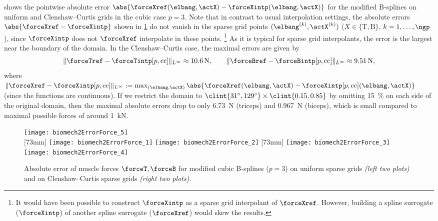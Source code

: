  shows the pointwise absolute error
$\abs{\forceXref(\elbang, \actX) - \forceXintp(\elbang, \actX)}$
for the modified B-splines on uniform and Clenshaw--Curtis grids
in the cubic case $p = 3$.
Note that in contrast to usual interpolation settings,
the absolute errors $\abs{\forceXref - \forceXintp}$
shown in \cref{fig:biomech2ErrorForce} do not vanish in the
sparse grid points $(\elbang^{(k)}, \actX^{(k)})$
($X \in \{\mathrm{T}, \mathrm{B}\}$, $k = 1, \dotsc, \ngp$),
since $\forceXintp$ does not $\forceXref$ interpolate
in these points.%
\footnote{%
  It would have been possible to construct $\forceXintp$
  as a sparse grid interpolant of $\forceXref$.
  However, building a spline surrogate ($\forceXintp$)
  of another spline surrogate ($\forceXref$) would skew the results.%
}
As it is typical for sparse grid interpolants,
the error is the largest near the boundary of the domain.
In the Clenshaw--Curtis case, the maximal errors are given by
\begin{equation}
  \norm[L^\infty]{\forceTref - \forceTintp[p,\cc]}
  \approx \SI{10.6}{\newton},\qquad
  \norm[L^\infty]{\forceBref - \forceBintp[p,\cc]}
  \approx \SI{9.51}{\newton},
\end{equation}
where $\norm[L^\infty]{\forceXref - \forceXintp[p,\cc]}
:= \max_{(\elbang, \actX)}
\abs{\forceXref(\elbang, \actX) - \forceXintp[p,\cc](\elbang, \actX)}$
(since the functions are continuous).
If we restrict the domain to
$\clint{\ang{31}, \ang{129}} \times \clint{0.15, 0.85}$
by omitting \SI{15}{\percent} on each side of the original domain,
then the maximal absolute errors drop to only
\SI{6.73}{\newton} (triceps) and \SI{0.967}{\newton} (biceps),
which is small compared to maximal possible forces of
around \SI{1}{\kilo\newton}.

\begin{figure}
  \texttt{[image: biomech2ErrorForce\_5]}%
  \\[2mm]%
  [73mm]{%
    \texttt{[image: biomech2ErrorForce\_1]}%
    \hfill%
    \texttt{[image: biomech2ErrorForce\_2]}%
  }%
  \hfill%
  [73mm]{%
    \texttt{[image: biomech2ErrorForce\_3]}%
    \hfill%
    \texttt{[image: biomech2ErrorForce\_4]}%
  }%
  \caption[Absolute error of muscle forces]{%
    Absolute error of muscle forces $\forceT, \forceB$ for
    modified cubic B-splines ($p = 3$)
    on uniform sparse grids \emph{(left two plots)} and
    on Clenshaw--Curtis sparse grids \emph{(right two plots).}%
  }%
  \label{fig:biomech2ErrorForce}%
\end{figure}

